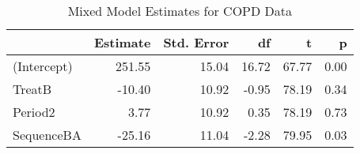 \begin{table}

\caption{Mixed Model Estimates for COPD Data}
\centering
\begin{tabular}[t]{>{}l|rrrrr}
\toprule
 & Estimate & Std. Error & df & t & p\\
\midrule
(Intercept) & 251.55 & 15.04 & 16.72 & 67.77 & 0.00\\
TreatB & -10.40 & 10.92 & -0.95 & 78.19 & 0.34\\
Period2 & 3.77 & 10.92 & 0.35 & 78.19 & 0.73\\
SequenceBA & -25.16 & 11.04 & -2.28 & 79.95 & 0.03\\
\bottomrule
\end{tabular}
\end{table}

